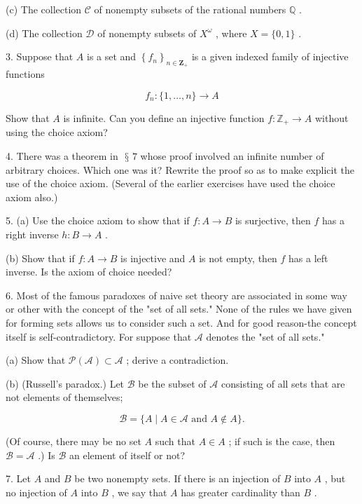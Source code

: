 \documentclass[10pt]{article}
\begin{document}
(c) The collection \(\mathcal{C}\) of nonempty subsets of the rational numbers \(\mathbb{Q}\) .

(d) The collection \(\mathcal{D}\) of nonempty subsets of \({X}^{\omega }\) , where \(X = \{ 0,1\}\) .

3. Suppose that \(A\) is a set and \({\left\{  {f}_{n}\right\}  }_{n \in  {\mathbf{Z}}_{ + }}\) is a given indexed family of injective functions

\[
{f}_{n} : \{ 1,\ldots ,n\}  \rightarrow  A
\]

Show that \(A\) is infinite. Can you define an injective function \(f : {\mathbb{Z}}_{ + } \rightarrow  A\) without using the choice axiom?

4. There was a theorem in \(\text{ § }7\) whose proof involved an infinite number of arbitrary choices. Which one was it? Rewrite the proof so as to make explicit the use of the choice axiom. (Several of the earlier exercises have used the choice axiom also.)

5. (a) Use the choice axiom to show that if \(f : A \rightarrow  B\) is surjective, then \(f\) has a right inverse \(h : B \rightarrow  A\) .

(b) Show that if \(f : A \rightarrow  B\) is injective and \(A\) is not empty, then \(f\) has a left inverse. Is the axiom of choice needed?

6. Most of the famous paradoxes of naive set theory are associated in some way or other with the concept of the "set of all sets." None of the rules we have given for forming sets allows us to consider such a set. And for good reason-the concept itself is self-contradictory. For suppose that \(\mathcal{A}\) denotes the "set of all sets."

(a) Show that \(\mathcal{P}\left( \mathcal{A}\right)  \subset  \mathcal{A}\) ; derive a contradiction.

(b) (Russell’s paradox.) Let \(\mathcal{B}\) be the subset of \(\mathcal{A}\) consisting of all sets that are not elements of themselves;

\[
\mathcal{B} = \{ A \mid  A \in  \mathcal{A}\text{ and }A \notin  A\} .
\]

(Of course, there may be no set \(A\) such that \(A \in  A\) ; if such is the case, then \(\mathcal{B} = \mathcal{A}\) .) Is \(\mathcal{B}\) an element of itself or not?

7. Let \(A\) and \(B\) be two nonempty sets. If there is an injection of \(B\) into \(A\) , but no injection of \(A\) into \(B\) , we say that \(A\) has greater cardinality than \(B\) .
\end{document}
